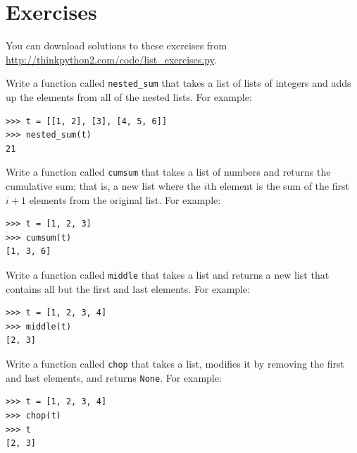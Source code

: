 \documentclass[10pt]{book}
\begin{document}
\section{Exercises}

You can download solutions to these exercises from
\url{http://thinkpython2.com/code/list_exercises.py}.

\begin{exercise}

Write a function called \verb"nested_sum" that takes a list of lists
of integers and adds up the elements from all of the nested lists.
For example:

\begin{verbatim}
>>> t = [[1, 2], [3], [4, 5, 6]]
>>> nested_sum(t)
21
\end{verbatim}

\end{exercise}

\begin{exercise}
\label{cumulative}

Write a function called {\tt cumsum} that takes a list of numbers and
returns the cumulative sum; that is, a new list where the $i$th
element is the sum of the first $i+1$ elements from the original list.
For example:

\begin{verbatim}
>>> t = [1, 2, 3]
>>> cumsum(t)
[1, 3, 6]
\end{verbatim}

\end{exercise}

\begin{exercise}

Write a function called \verb"middle" that takes a list and
returns a new list that contains all but the first and last
elements.  For example:

\begin{verbatim}
>>> t = [1, 2, 3, 4]
>>> middle(t)
[2, 3]
\end{verbatim}

\end{exercise}

\begin{exercise}

Write a function called \verb"chop" that takes a list, modifies it
by removing the first and last elements, and returns {\tt None}.
For example:

\begin{verbatim}
>>> t = [1, 2, 3, 4]
>>> chop(t)
>>> t
[2, 3]
\end{verbatim}

\end{exercise}
\end{document}
